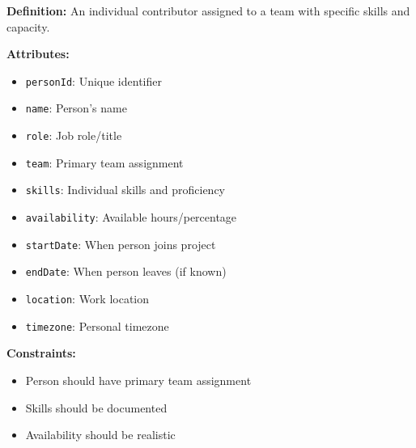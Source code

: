\documentclass[11pt,letterpaper]{article}
\begin{document}
\begin{definitionbox}
\textbf{Definition:} An individual contributor assigned to a team with specific skills and capacity.

\textbf{Attributes:}
\begin{itemize}[nosep]
    \item \texttt{personId}: Unique identifier
    \item \texttt{name}: Person's name
    \item \texttt{role}: Job role/title
    \item \texttt{team}: Primary team assignment
    \item \texttt{skills}: Individual skills and proficiency
    \item \texttt{availability}: Available hours/percentage
    \item \texttt{startDate}: When person joins project
    \item \texttt{endDate}: When person leaves (if known)
    \item \texttt{location}: Work location
    \item \texttt{timezone}: Personal timezone
\end{itemize}

\textbf{Constraints:}
\begin{itemize}[nosep]
    \item Person should have primary team assignment
    \item Skills should be documented
    \item Availability should be realistic
\end{itemize}
\end{definitionbox}
\end{document}
